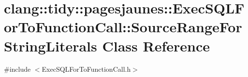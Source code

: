 \hypertarget{classclang_1_1tidy_1_1pagesjaunes_1_1_exec_s_q_l_for_to_function_call_1_1_source_range_for_string_literals}{}\section{clang\+:\+:tidy\+:\+:pagesjaunes\+:\+:Exec\+S\+Q\+L\+For\+To\+Function\+Call\+:\+:Source\+Range\+For\+String\+Literals Class Reference}
\label{classclang_1_1tidy_1_1pagesjaunes_1_1_exec_s_q_l_for_to_function_call_1_1_source_range_for_string_literals}


{\ttfamily \#include $<$Exec\+S\+Q\+L\+For\+To\+Function\+Call.\+h$>$}

